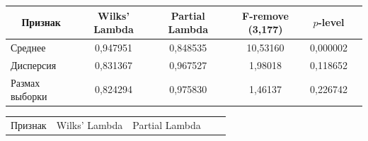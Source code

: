\begin{table}\small  %

\begin{center}


\label{tab1}

\vspace*{2ex}



\begin{tabular}{|l|c|c|c|c|c|}

\hline

\multicolumn{1}{|c|}{Признак} & {Wilks' Lambda} & {Partial Lambda} & 

{F-remove (3,177)} & {$p$-level}\\ 

\hline

Среднее & 0,947951 & 0,848535 & 10,53160\hphantom{9} & 0,000002\\

Дисперсия & 0,831367 & 0,967527 & 1,98018 & 0,118652\\

Размах выборки & 0,824294 & 0,975830 & 1,46137 & 0,226742\\ 

\hline

\end{tabular}

\end{center}




\begin{center}


\vspace*{2ex}



\tabcolsep=8.4pt

\begin{tabular}{|l|c|c|c|c|}

\hline

\multicolumn{1}{|c|}{Признак} & {Wilks' Lambda} & {Partial Lambda} & 


\end{tabular}
\end{center}
\end{table}
